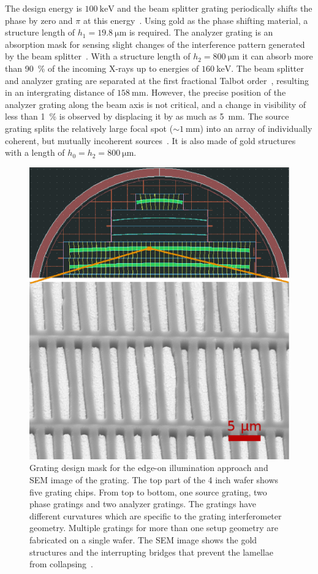 The design energy
is $\SI{100}{\kilo\electronvolt}$ and the beam splitter grating periodically
shifts the phase by zero and $\pi$ at this energy~\cite{David2002}. Using
gold as the phase shifting material, a structure length of
$h_1 = \SI{19.8}{\micro \metre}$ is required. The analyzer grating is an absorption mask
for sensing slight changes of the interference pattern generated by the beam
splitter~\cite{Momose2003a}. With a structure length of $h_2 =
\SI{800}{\micro \metre}$
it can absorb more than \SI{90}{\percent} of the incoming X-rays up to energies of 
$\SI{160}{\kilo\electronvolt}$. The beam splitter and analyzer grating are
separated at the first fractional Talbot order~\cite{Weitkamp2005},
resulting in an intergrating distance of $\SI{158}{\milli\metre}$. However,
the precise position of the analyzer grating along the beam axis is not
critical, and a change in visibility of less than \SI{1}{\percent} is
observed by displacing it by as much as \SI{5}{\milli\metre}. The
source grating splits the relatively large focal spot ($\sim
\SI{1}{\milli\metre}$) into an array of individually coherent, but mutually
incoherent sources~\cite{Pfeiffer2006}. It is also made of gold structures
with a length of $h_0 = h_2 = \SI{800}{\micro \metre}$.
\begin{figure}[h!]
    \centering
    \includegraphics[width=.6\textwidth]{gfx/grating_mask.eps}
    \caption{Grating design mask for
        the edge-on illumination approach and \ac{SEM}
        image of the grating. The top part of the 4 inch wafer shows
        five grating chips. From top to bottom, one source grating, two
        phase gratings and two analyzer gratings. The
        gratings have different curvatures which are specific to the grating
        interferometer geometry. Multiple gratings for more than one setup
        geometry are fabricated on a single wafer.
        The \ac{SEM} image shows the gold structures and the interrupting bridges
        that prevent the lamellae from collapsing~\cite{Kenntner2010}.}\label{Fig:grating_mask}
\end{figure}

